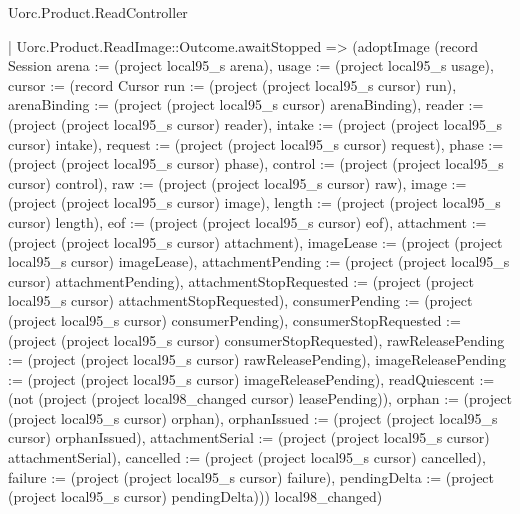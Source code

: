 \begin{lexlean}{Uorc.Product.ReadController}
\begin{semanticmodule}
{      | Uorc.Product.ReadImage::Outcome.awaitStopped => (adoptImage (record Session {arena := (project local95_s arena), usage := (project local95_s usage), cursor := (record Cursor {run := (project (project local95_s cursor) run), arenaBinding := (project (project local95_s cursor) arenaBinding), reader := (project (project local95_s cursor) reader), intake := (project (project local95_s cursor) intake), request := (project (project local95_s cursor) request), phase := (project (project local95_s cursor) phase), control := (project (project local95_s cursor) control), raw := (project (project local95_s cursor) raw), image := (project (project local95_s cursor) image), length := (project (project local95_s cursor) length), eof := (project (project local95_s cursor) eof), attachment := (project (project local95_s cursor) attachment), imageLease := (project (project local95_s cursor) imageLease), attachmentPending := (project (project local95_s cursor) attachmentPending), attachmentStopRequested := (project (project local95_s cursor) attachmentStopRequested), consumerPending := (project (project local95_s cursor) consumerPending), consumerStopRequested := (project (project local95_s cursor) consumerStopRequested), rawReleasePending := (project (project local95_s cursor) rawReleasePending), imageReleasePending := (project (project local95_s cursor) imageReleasePending), readQuiescent := (not (project (project local98_changed cursor) leasePending)), orphan := (project (project local95_s cursor) orphan), orphanIssued := (project (project local95_s cursor) orphanIssued), attachmentSerial := (project (project local95_s cursor) attachmentSerial), cancelled := (project (project local95_s cursor) cancelled), failure := (project (project local95_s cursor) failure), pendingDelta := (project (project local95_s cursor) pendingDelta)})}) local98_changed)
}
\end{semanticmodule}
\end{lexlean}
